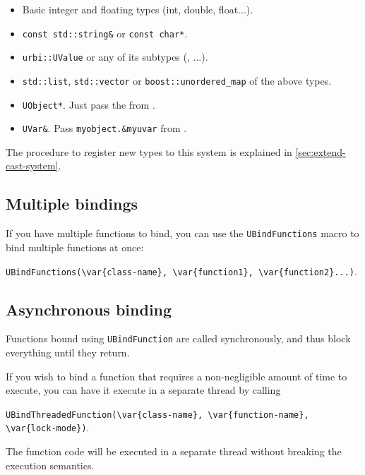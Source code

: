 \begin{itemize}
\item Basic integer and floating types (int, double, float...).
\item \lstinline{const std::string&} or \lstinline{const char*}.
\item \lstinline{urbi::UValue} or any of its subtypes (\UBinary, \UList...).
\item \lstinline{std::list}, \lstinline{std::vector} or
\lstinline{boost::unordered_map} of the above types.
\item \lstinline{UObject*}. Just pass the \UObject from \us.
\item \lstinline{UVar&}. Pass \lstinline{myobject.&myuvar} from \us.
\end{itemize}

The procedure to register new types to this system is explained in
\autoref{sec:extend-cast-system}.

\subsection{Multiple bindings}
If you have multiple functions to bind, you can use the
\lstinline|UBindFunctions| macro to bind multiple functions at once:

\lstinline|UBindFunctions(\var{class-name}, \var{function1}, \var{function2}...)|.

\subsection{Asynchronous binding}
\label{sec:uobject:asynchronous-binding}
Functions bound using \lstinline{UBindFunction} are called synchronously, and
thus block everything until they return.

If you wish to bind a function that requires a non-negligible amount of time
to execute, you can have it execute in a separate thread by calling

\lstinline|UBindThreadedFunction(\var{class-name}, \var{function-name}, \var{lock-mode})|.

The function code will be executed in a separate thread without breaking the
\us execution semantics.

